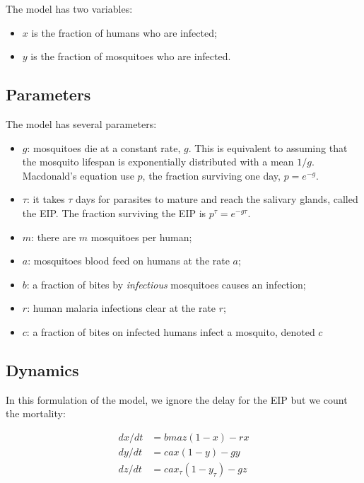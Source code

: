 \documentclass[
]{book}
\begin{document}
The model has two variables:

\begin{itemize}
\item
  \(x\) is the fraction of humans who are infected;
\item
  \(y\) is the fraction of mosquitoes who are infected.
\end{itemize}

\hypertarget{parameters}{%
\subsection{Parameters}\label{parameters}}

The model has several parameters:

\begin{itemize}
\item
  \(g\): mosquitoes die at a constant rate, \(g\). This is equivalent to assuming that the mosquito lifespan is exponentially distributed with a mean \(1/g\). Macdonald's equation use \(p\), the fraction surviving one day, \(p = e^{-g}\).
\item
  \(\tau\): it takes \(\tau\) days for parasites to mature and reach the salivary glands, called the EIP. The fraction surviving the EIP is \(p^\tau = e^{-g \tau}\).
\item
  \(m\): there are \(m\) mosquitoes per human;
\item
  \(a\): mosquitoes blood feed on humans at the rate \(a\);
\item
  \(b\): a fraction of bites by \emph{infectious} mosquitoes causes an infection;
\item
  \(r\): human malaria infections clear at the rate \(r\);
\item
  \(c\): a fraction of bites on infected humans infect a mosquito, denoted \(c\)
\end{itemize}

\hypertarget{dynamics}{%
\subsection{Dynamics}\label{dynamics}}

In this formulation of the model, we ignore the delay for the EIP but we count the mortality:

\[ 
\begin{array}{rl}
dx/dt &= b m a z (1-x) - r x \\
dy/dt &= c a x (1-y) - g y  \\
dz/dt &= c a x_\tau (1-y_\tau) - g z  \\
\end{array}
\]
\end{document}
